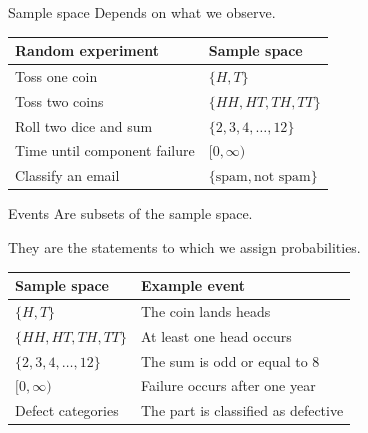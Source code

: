 \documentclass[12pt]{beamer}
\begin{document}
\begin{frame}{}
\begin{block}{Sample space}
Depends on what we observe.

\vspace{0.3cm}
\begin{tabular}{>{\raggedright\arraybackslash}p{} >{\raggedright\arraybackslash}p{}}
\toprule
Random experiment & Sample space \\
\midrule
Toss one coin & $\{H,T\}$ \\
Toss two coins & $\{HH, HT, TH, TT\}$ \\
Roll two dice and sum & $\{2,3,4,\ldots,12\}$ \\
Time until component failure & $[0,\infty)$ \\
Classify an email & $\{\text{spam},\text{not spam}\}$ \\
\bottomrule
\end{tabular}
\end{block}
\end{frame}

\begin{frame}{}
\begin{block}{Events}
Are subsets of the sample space.

They are the statements to which we assign probabilities.

\vspace{0.3cm}
\begin{tabular}{>{\raggedright\arraybackslash}p{} >{\raggedright\arraybackslash}p{}}
\toprule
Sample space & Example event \\
\midrule
$\{H,T\}$ & The coin lands heads \\
$\{HH, HT, TH, TT\}$ & At least one head occurs \\
$\{2,3,4,\ldots,12\}$ & The sum is odd or equal to 8 \\
$[0,\infty)$ & Failure occurs after one year \\
Defect categories & The part is classified as defective \\
\bottomrule
\end{tabular}
\end{block}
\end{frame}
\end{document}
